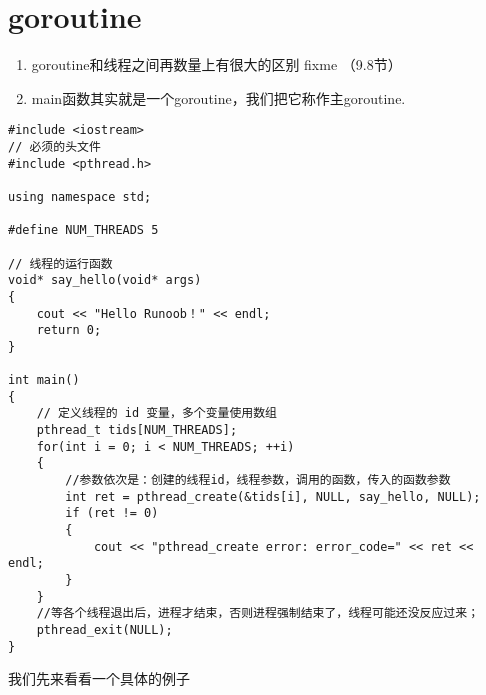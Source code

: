 \hypertarget{goroutine-1}{%
\section{goroutine}\label{goroutine-1}}

\begin{enumerate}
\tightlist
\item
  goroutine和线程之间再数量上有很大的区别 fixme （9.8节）
\item
  main函数其实就是一个goroutine，我们把它称作主goroutine.
\end{enumerate}

\begin{Shaded}
\begin{Highlighting}[]
\end{Highlighting}
\end{Shaded}

\begin{verbatim}
#include <iostream>
// 必须的头文件
#include <pthread.h>

using namespace std;

#define NUM_THREADS 5

// 线程的运行函数
void* say_hello(void* args)
{
    cout << "Hello Runoob！" << endl;
    return 0;
}

int main()
{
    // 定义线程的 id 变量，多个变量使用数组
    pthread_t tids[NUM_THREADS];
    for(int i = 0; i < NUM_THREADS; ++i)
    {
        //参数依次是：创建的线程id，线程参数，调用的函数，传入的函数参数
        int ret = pthread_create(&tids[i], NULL, say_hello, NULL);
        if (ret != 0)
        {
            cout << "pthread_create error: error_code=" << ret << endl;
        }
    }
    //等各个线程退出后，进程才结束，否则进程强制结束了，线程可能还没反应过来；
    pthread_exit(NULL);
}
\end{verbatim}

我们先来看看一个具体的例子

